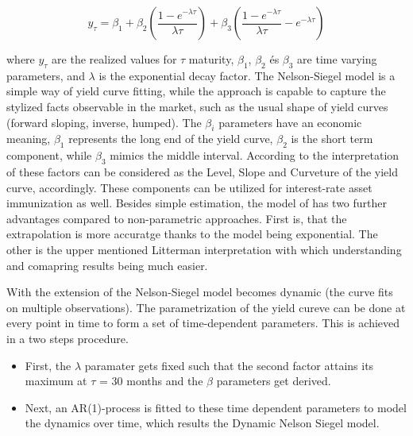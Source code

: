 \documentclass[12pt,bibliography=totoc]{article}
\begin{document}
\begin{equation}
y_{\tau}=\beta_{1}+\beta_{2}\left ( \frac{1-e^{-\lambda\tau}}{\lambda\tau} \right )+\beta_{3}\left ( \frac{1-e^{-\lambda\tau}}{\lambda\tau} -e^{-\lambda\tau}\right )
\end{equation}


where $y_{\tau}$ are the realized values for $\tau$ maturity, $\beta_{1}$, $\beta_{2}$ és $\beta_{3}$ are time varying parameters, and $\lambda$ is the exponential decay factor.
The Nelson-Siegel model is a simple way of yield curve fitting, while the approach is capable to capture the stylized facts observable in the market, such as the usual shape of yield curves (forward sloping, inverse, humped).
The $\beta_{i}$ parameters have an economic meaning, $\beta_{1}$ represents the long end of the yield curve,  $\beta_{2}$ is the short term component, while $\beta_{3}$ mimics the middle interval. According to the interpretation of \cite{litterman1991common} these factors can be considered as the Level, Slope and Curveture of the yield curve, accordingly. These components can be utilized for interest-rate asset immunization as well. Besides simple estimation, the model of \cite{diebold2006forecasting} has two further advantages compared to non-parametric approaches. First is, that the extrapolation is more accuratge thanks to the model being exponential. The other is the upper mentioned Litterman interpretation with which understanding and comapring results being much easier.
 
With the extension of \cite{diebold2006forecasting} the Nelson-Siegel model becomes dynamic (the curve fits on multiple observations). The parametrization of the yield cureve can be done at every point in time
to form a set of time-dependent parameters. This is achieved in a two steps procedure. 
\begin{itemize}
\item First, the $\lambda$  paramater gets fixed such that the second factor attains its maximum at $\tau$ = 30 months and the $\beta$ parameters get derived.
\item Next, an AR(1)-process is fitted to these time dependent parameters to model the dynamics over time, which results the Dynamic Nelson Siegel model.
\end{itemize}
\end{document}

